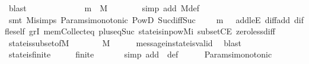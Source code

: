\begin{isabellebody}
\ blast\ \isanewline
\ \ \ \ \isamarkupfalse%
\ \isamarkupfalse%
\isanewline
\ \ \ \ \ \ {\isachardoublequoteopen}m\ {\isasymin}\ M{\isachardoublequoteclose}\isanewline
\ \ \ \ \ \ \isamarkupfalse%
\ {\isacharparenleft}simp\ add{\isacharcolon}\ M{\isacharunderscore}def{\isacharparenright}\isanewline
\ \ \ \ \ \ \isamarkupfalse%
\ {\isacharparenleft}smt\ M{\isacharunderscore}i{\isachardot}simps\ Params{\isachardot}{\isasymSigma}i{\isacharunderscore}monotonic\ PowD\ Suc{\isacharunderscore}diff{\isacharunderscore}Suc\ {\isacartoucheopen}{\isasymsigma}\ {\isasymin}\ {\isasymSigma}\ {\isasymand}\ m\ {\isasymin}\ {\isasymsigma}{\isacartoucheclose}\ add{\isacharunderscore}leE\ diff{\isacharunderscore}add\ diff{\isacharunderscore}le{\isacharunderscore}self\ gr{}I\ mem{\isacharunderscore}Collect{\isacharunderscore}eq\ plus{\isacharunderscore}{}{\isacharunderscore}eq{\isacharunderscore}Suc\ state{\isacharunderscore}is{\isacharunderscore}in{\isacharunderscore}pow{\isacharunderscore}M{\isacharunderscore}i\ subsetCE\ zero{\isacharunderscore}less{\isacharunderscore}diff{\isacharparenright}\isanewline
\ \ \isamarkupfalse%
%
\endisatagproof
{\isafoldproof}%
%
\isadelimproof
\isanewline
%
\endisadelimproof
\isanewline
\ \ \isamarkupfalse%
\ state{\isacharunderscore}is{\isacharunderscore}subset{\isacharunderscore}of{\isacharunderscore}M\ {\isacharcolon}\ {\isachardoublequoteopen}{\isasymforall}\ {\isasymsigma}\ {\isasymin}\ {\isasymSigma}{\isachardot}\ {\isasymsigma}\ {\isasymsubseteq}\ M{\isachardoublequoteclose}\isanewline
%
\isadelimproof
\ \ \ \ %
\endisadelimproof
%
\isatagproof
{}\isamarkupfalse%
\ message{\isacharunderscore}in{\isacharunderscore}state{\isacharunderscore}is{\isacharunderscore}valid\ \isamarkupfalse%
\ blast%
\endisatagproof
{\isafoldproof}%
%
\isadelimproof
\isanewline
%
\endisadelimproof
\ \ \isanewline
\ \ \isamarkupfalse%
\ state{\isacharunderscore}is{\isacharunderscore}finite\ {\isacharcolon}\ {\isachardoublequoteopen}{\isasymforall}\ {\isasymsigma}\ {\isasymin}\ {\isasymSigma}{\isachardot}\ finite\ {\isasymsigma}{\isachardoublequoteclose}\isanewline
%
\isadelimproof
\ \ \ \ %
\endisadelimproof
%
\isatagproof
{}\isamarkupfalse%
\ {\isacharparenleft}simp\ add{\isacharcolon}\ \ {\isasymSigma}{\isacharunderscore}def{\isacharparenright}\isanewline
\ \ \ \ \isamarkupfalse%
\ Params{\isachardot}{\isasymSigma}i{\isacharunderscore}monotonic\ \isamarkupfalse%

\end{isabellebody}
